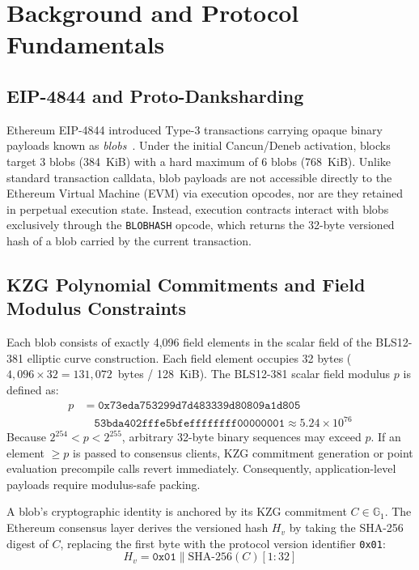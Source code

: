\section{Background and Protocol Fundamentals}
\label{sec:background}

\subsection{EIP-4844 and Proto-Danksharding}
Ethereum EIP-4844 introduced Type-3 transactions carrying opaque binary payloads known as \textit{blobs}~\cite{buterin2022eip4844}. Under the initial Cancun/Deneb activation, blocks target 3 blobs (384~KiB) with a hard maximum of 6 blobs (768~KiB). Unlike standard transaction calldata, blob payloads are not accessible directly to the Ethereum Virtual Machine (EVM) via execution opcodes, nor are they retained in perpetual execution state. Instead, execution contracts interact with blobs exclusively through the \texttt{BLOBHASH} opcode, which returns the 32-byte versioned hash of a blob carried by the current transaction.

\subsection{KZG Polynomial Commitments and Field Modulus Constraints}
Each blob consists of exactly 4,096 field elements in the scalar field of the BLS12-381 elliptic curve construction. Each field element occupies 32 bytes ($4,096 \times 32 = 131,072$~bytes / 128~KiB). The BLS12-381 scalar field modulus $p$ is defined as:
\begin{align}
p &= \mathtt{0x73eda753299d7d483339d80809a1d805} \nonumber \\
  &\quad \mathtt{53bda402fffe5bfeffffffff00000001} \approx 5.24 \times 10^{76}
\end{align}
Because $2^{254} < p < 2^{255}$, arbitrary 32-byte binary sequences may exceed $p$. If an element $\ge p$ is passed to consensus clients, KZG commitment generation or point evaluation precompile calls revert immediately. Consequently, application-level payloads require modulus-safe packing.

A blob's cryptographic identity is anchored by its KZG commitment $C \in \mathbb{G}_1$. The Ethereum consensus layer derives the versioned hash $H_v$ by taking the SHA-256 digest of $C$, replacing the first byte with the protocol version identifier \texttt{0x01}:
\begin{equation}
H_v = \texttt{0x01} \parallel \text{SHA-256}(C)[1:32]
\end{equation}

